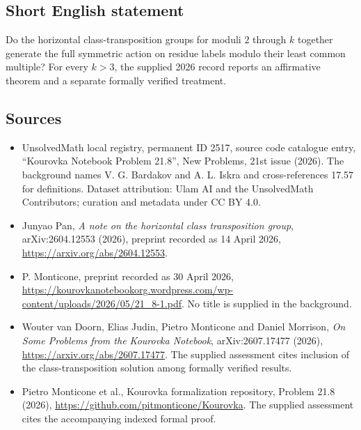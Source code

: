 \documentclass[11pt]{article}
\begin{document}
\subsection{Short English statement}
Do the horizontal class-transposition groups for moduli $2$ through $k$ together generate the full symmetric action on residue labels modulo their least common multiple? For every $k>3$, the supplied 2026 record reports an affirmative theorem and a separate formally verified treatment.
\subsection{Sources}
\begin{itemize}
\item UnsolvedMath local registry, permanent ID 2517, source code catalogue entry, ``Kourovka Notebook Problem 21.8'', New Problems, 21st issue (2026). The background names V. G. Bardakov and A. L. Iskra and cross-references 17.57 for definitions. Dataset attribution: Ulam AI and the UnsolvedMath Contributors; curation and metadata under CC BY 4.0.
\item Junyao Pan, \emph{A note on the horizontal class transposition group}, arXiv:2604.12553 (2026), preprint recorded as 14 April 2026, \url{https://arxiv.org/abs/2604.12553}.
\item P. Monticone, preprint recorded as 30 April 2026, \url{https://kourovkanotebookorg.wordpress.com/wp-content/uploads/2026/05/21_8-1.pdf}. No title is supplied in the background.
\item Wouter van Doorn, Elias Judin, Pietro Monticone and Daniel Morrison, \emph{On Some Problems from the Kourovka Notebook}, arXiv:2607.17477 (2026), \url{https://arxiv.org/abs/2607.17477}. The supplied assessment cites inclusion of the class-transposition solution among formally verified results.
\item Pietro Monticone et al., Kourovka formalization repository, Problem 21.8 (2026), \url{https://github.com/pitmonticone/Kourovka}. The supplied assessment cites the accompanying indexed formal proof.
\end{itemize}
\end{document}
